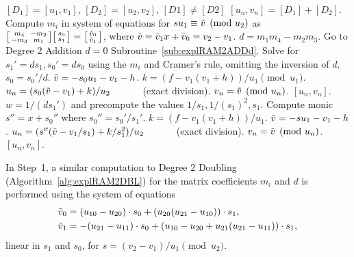 \begin{algorithm}[htbp]
\caption{Genus 2 Ramified Model Degree 2 Addition\label{alg:explRAM2ADD}}
\begin{algorithmic}[1]
\Require $[D_1] = [u_1,v_1]$, $[D_2] = [u_2,v_2]$, $[D1] \not = [D2]$ \smallskip
\Ensure $[u_n,v_n] = [D_1] + [D_2] $.
\algrule
\vspace{-3pt}
\State Compute $m_i$ in system of equations for $su_1\equiv \tilde{v} \pmod{u_2}$ as $ \bigl[ \begin{smallmatrix} m_4 & -m_2\\ -m_3 & m_1\end{smallmatrix}\bigr] \bigl[ \begin{smallmatrix} s_0\\ s_1 \end{smallmatrix} \bigr ] = \bigl[ \begin{smallmatrix}\tilde{v}_0 \\  \tilde{v}_1\end{smallmatrix} \bigr ]$, where $\tilde{v} = \tilde{v}_1x + \tilde{v}_0 = v_2 - v_1$.
\State $d = m_1m_4 - m_2m_3$.
 \hspace{1pt} Go to Degree 2 Addition $d=0$ Subroutine~\ref{sub:explRAM2ADDd}.
\EndIf
\State Solve for $s_1' = ds_1, s_0' = ds_0$ using the $m_i$ and Cramer's rule, omitting the inversion of $d$.
    \State $s_0 = s_0'/d$.
    \State $\tilde{v} = -s_0u_1 - v_1 - h$.
    \State $k = (f - v_1(v_1 + h))/u_1 \pmod{u_1}$.
    \State $u_n = (s_0(\tilde{v} - v_1) + k)/u_2 \quad\quad\quad$ (exact division).
    \State $v_n = \tilde{v} \pmod{u_n}$.
    \State \Return $[u_n,v_n]$.
\EndIf
\State $w = 1/(ds_1')$ and precompute the values $1/s_1, 1/(s_1)^2, s_1$. 
\State Compute monic $s'' = x + s_0''$ where $s_0'' = s_0'/s_1'$.
\State $k = (f - v_1(v_1 + h))/u_1$.
\State $\tilde{v} = -su_1 - v_1 - h$.
\State $u_n = (s''(\tilde{v} - v_1/s_1) + k/s_1^2)/u_2 \quad\quad\quad$ (exact division).
\State $v_n = \tilde{v} \pmod{u_n}$.
\State \Return $[u_n,v_n]$.
\end{algorithmic}
\end{algorithm}


In Step~1, a similar computation to Degree 2 Doubling (Algorithm~\ref{alg:explRAM2DBL}) for
the matrix coefficients $m_i$ and $d$ is performed using the system of equations 
\begin{align*} 
    \tilde{v}_0 &= (u_{10} - u_{20}) \cdot s_0 + (u_{20}(u_{21} - u_{10})) \cdot s_1,\\
    \tilde{v}_1 &= -(u_{21}- u_{11}) \cdot s_0 + (u_{10} - u_{20} + u_{21}(u_{21}-u_{11})) \cdot s_1,
\end{align*} linear in $s_1$ and $s_0$, for $s = (v_2 - v_1)/u_1 \pmod{u_2}$.

